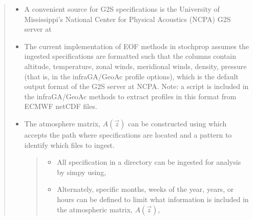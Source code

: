 \documentclass[letterpaper,10pt,english]{sphinxmanual}
\begin{document}
\begin{itemize}
\begin{quote}
\begin{itemize}
\item {} 
\sphinxAtStartPar
A convenient source for G2S specifications is the University of Mississippi’s National Center for Physical Acoustics (NCPA) G2S server at 

\item {} 
\sphinxAtStartPar
The current implementation of EOF methods in stochprop assumes the ingested specifications are formatted such that the columns contain altitude, temperature, zonal winds, meridional winds, density, pressure (that is,  in the infraGA/GeoAc profile options), which is the default output format of the G2S server at NCPA.  Note: a script is included in the infraGA/GeoAc methods to extract profiles in this format from ECMWF netCDF files.

\item {} 
\sphinxAtStartPar
The atmosphere matrix, \(A(\vec{z})\) can be constructed using  which accepts the path where specifications are located and a pattern to identify which files to ingest.
\begin{quote}
\begin{itemize}
\item {} 
\sphinxAtStartPar
All specification in a directory can be ingested for analysis by simpy using,

\end{itemize}

\begin{sphinxVerbatim}[commandchars=\\\{\}]
    
\end{sphinxVerbatim}
\begin{itemize}
\item {} 
\sphinxAtStartPar
Alternately, specific months, weeks of the year, years, or hours can be defined to limit what information is included in the atmospheric matrix, \(A(\vec{z})\),

\end{itemize}


\end{quote}
\end{itemize}
\end{quote}
\end{itemize}
\end{document}
